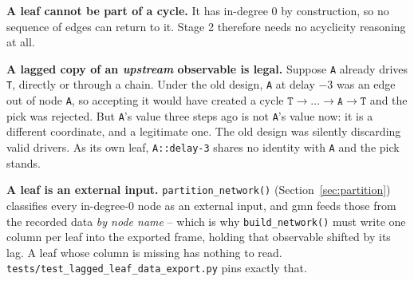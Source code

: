 \documentclass[11pt]{article}
\begin{document}
\begin{steps}
\item \textbf{A leaf cannot be part of a cycle.} It has in-degree 0 by construction, so no sequence of edges can return to it. Stage 2 therefore needs no acyclicity reasoning at all.
\item \textbf{A lagged copy of an \emph{upstream} observable is legal.} Suppose \texttt{A} already drives \texttt{T}, directly or through a chain. Under the old design, \texttt{A} at delay $-3$ was an edge out of node \texttt{A}, so accepting it would have created a cycle $\texttt{T} \to \dots \to \texttt{A} \to \texttt{T}$ and the pick was rejected. But \texttt{A}'s value three steps ago is not \texttt{A}'s value now: it is a different coordinate, and a legitimate one. The old design was silently discarding valid drivers. As its own leaf, \texttt{A::delay-3} shares no identity with \texttt{A} and the pick stands.
\item \textbf{A leaf is an external input.} \texttt{partition\_network()} (Section~\ref{sec:partition}) classifies every in-degree-0 node as an external input, and gmn feeds those from the recorded data \emph{by node name} -- which is why \texttt{build\_network()} must write one column per leaf into the exported frame, holding that observable shifted by its lag. A leaf whose column is missing has nothing to read. \texttt{tests/test\_lagged\_leaf\_data\_export.py} pins exactly that.
\end{steps}
\end{document}
